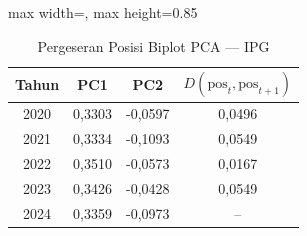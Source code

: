 \begin{table}[H]
\centering
\caption{Pergeseran Posisi Biplot PCA --- IPG} \label{tab:appjarak_pca_loading_ipg}
\begin{adjustbox}{max width=\textwidth, max height=0.85\textheight}
\begin{tabular}{|c|c|c|c|}
\hline
\textbf{Tahun} & \textbf{PC1} & \textbf{PC2} & \textbf{$D(\text{pos}_t, \text{pos}_{t+1})$} \\
\hline
2020 & 0,3303 & -0,0597 & 0,0496 \\
2021 & 0,3334 & -0,1093 & 0,0549 \\
2022 & 0,3510 & -0,0573 & 0,0167 \\
2023 & 0,3426 & -0,0428 & 0,0549 \\
2024 & 0,3359 & -0,0973 & -- \\
\hline
\end{tabular}
\end{adjustbox}
\end{table}